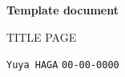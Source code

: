 \begin{titlepage}
  \begin{center}
    \vspace*{1cm}

    \Huge
    \textbf{Template document}

    \vspace{0.5cm}
    \LARGE

    TITLE PAGE

    \vspace{1.5cm}

    \texttt{Yuya HAGA}
    \texttt{00-00-0000}


    \vspace{0.8cm}

    \vfill

    \Large

  \end{center}
\end{titlepage}
